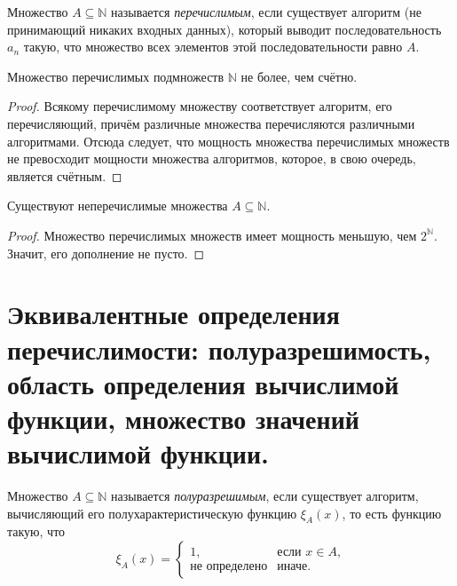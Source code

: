 \documentclass{article}
\begin{document}
    \begin{definition}
        Множество $A \subseteq \mathbb{N}$ называется \textit{перечислимым}, если существует
        алгоритм (не принимающий никаких входных данных), который выводит последовательность $a_n$
        такую, что множество всех элементов этой последовательности равно $A$.
    \end{definition}

    \begin{statement}
        Множество перечислимых подмножеств $\mathbb{N}$ не более, чем счётно.
    \end{statement}
    \begin{proof}
        Всякому перечислимому множеству соответствует алгоритм, его перечисляющий, причём различные множества
        перечисляются различными алгоритмами. Отсюда следует, что мощность множества перечислимых множеств не
        превосходит мощности множества алгоритмов, которое, в свою очередь, является счётным.
    \end{proof}

    \begin{theorem}
        Существуют неперечислимые множества $A \subseteq \mathbb{N}$.
    \end{theorem}
    \begin{proof}
        Множество перечислимых множеств имеет мощность меньшую, чем $2^\mathbb{N}$. Значит, его дополнение
        не пусто.
    \end{proof}

    \section{Эквивалентные определения перечислимости: полуразрешимость, область определения
    вычислимой функции, множество значений вычислимой функции.}

    \begin{definition}
        Множество $A \subseteq \mathbb{N}$ называется \textit{полуразрешимым}, если существует алгоритм,
        вычисляющий его полухарактеристическую функцию $\xi_A(x)$, то есть функцию такую, что
        $$
            \xi_A(x) =
            \begin{cases}
                1, & \text{если $x \in A$,}\\
                \text{не определено} & \text{иначе.}
            \end{cases}
        $$
    \end{definition}
\end{document}

